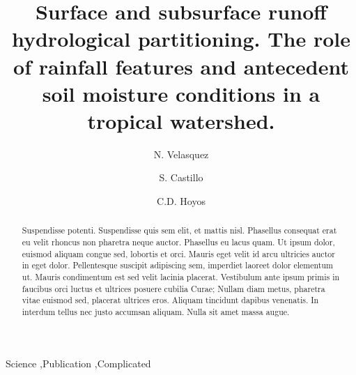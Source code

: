 \documentclass[preprint,12pt]{elsarticle}
\begin{document}
\begin{frontmatter}


\title{Surface and subsurface runoff hydrological partitioning. The role of rainfall features and antecedent soil moisture conditions in a tropical watershed.}




\author[1,2]{N. Velasquez}
\author[2]{S. Castillo}
\author[2, 3]{C.D. Hoyos}

\address[1]{Iowa University, IIHR}
\address[2]{EAFIT university.}
\address[3]{Universidad nacional de Colombia.}

\begin{abstract}
Suspendisse potenti. Suspendisse quis sem elit, et mattis nisl. Phasellus consequat erat eu velit rhoncus non pharetra neque auctor. Phasellus eu lacus quam. Ut ipsum dolor, euismod aliquam congue sed, lobortis et orci. Mauris eget velit id arcu ultricies auctor in eget dolor. Pellentesque suscipit adipiscing sem, imperdiet laoreet dolor elementum ut. Mauris condimentum est sed velit lacinia placerat. Vestibulum ante ipsum primis in faucibus orci luctus et ultrices posuere cubilia Curae; Nullam diam metus, pharetra vitae euismod sed, placerat ultrices eros. Aliquam tincidunt dapibus venenatis. In interdum tellus nec justo accumsan aliquam. Nulla sit amet massa augue.
\end{abstract}

\begin{keyword}
Science \sep Publication \sep Complicated


\end{keyword}

\end{frontmatter}
\end{document}
